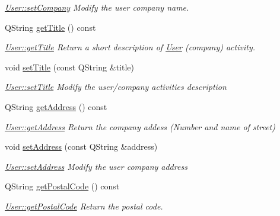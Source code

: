 \begin{DoxyCompactItemize}
\begin{DoxyCompactList}\small\item\em \hyperlink{classModels_1_1User_ab51a6e7ea016ad3c7d18c754582edd53}{User\+::set\+Company} Modify the user {\itshape company} name. \end{DoxyCompactList}\item 
Q\+String \hyperlink{classModels_1_1User_a56a37a1b1125c28e8e72c9a3551b7da5}{get\+Title} () const 
\begin{DoxyCompactList}\small\item\em \hyperlink{classModels_1_1User_a56a37a1b1125c28e8e72c9a3551b7da5}{User\+::get\+Title} Return a short description of \hyperlink{classModels_1_1User}{User} (company) activity. \end{DoxyCompactList}\item 
void \hyperlink{classModels_1_1User_a0fe65ebdee17c2986c874e480e1cb0bd}{set\+Title} (const Q\+String \&title)
\begin{DoxyCompactList}\small\item\em \hyperlink{classModels_1_1User_a0fe65ebdee17c2986c874e480e1cb0bd}{User\+::set\+Title} Modify the user/company activities {\itshape description} \end{DoxyCompactList}\item 
Q\+String \hyperlink{classModels_1_1User_afef76dde9b2e3fdb3c2fef33c2dc0d4d}{get\+Address} () const 
\begin{DoxyCompactList}\small\item\em \hyperlink{classModels_1_1User_afef76dde9b2e3fdb3c2fef33c2dc0d4d}{User\+::get\+Address} Return the company addess (Number and name of street) \end{DoxyCompactList}\item 
void \hyperlink{classModels_1_1User_a2a6098ed13472398a972944b88905ebd}{set\+Address} (const Q\+String \&address)
\begin{DoxyCompactList}\small\item\em \hyperlink{classModels_1_1User_a2a6098ed13472398a972944b88905ebd}{User\+::set\+Address} Modify the user company {\itshape address} \end{DoxyCompactList}\item 
Q\+String \hyperlink{classModels_1_1User_a4d6dae7e681b0acc7bbd1c4cc7b84062}{get\+Postal\+Code} () const 
\begin{DoxyCompactList}\small\item\em \hyperlink{classModels_1_1User_a4d6dae7e681b0acc7bbd1c4cc7b84062}{User\+::get\+Postal\+Code} Return the postal code. \end{DoxyCompactList}\item 

\end{DoxyCompactItemize}
